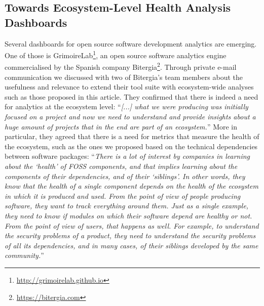\documentclass[smallextended]{svjour3}       %
\begin{document}
\subsection{Towards Ecosystem-Level Health Analysis Dashboards}
\label{sec:applications}

Several dashboards for open source software development analytics are emerging. One of those is GrimoireLab\footnote{\url{http://grimoirelab.github.io}}, an open source software analytics engine commercialised by the Spanish  company Bitergia\footnote{\url{https://bitergia.com}}. Through private e-mail communication we discussed with two of Bitergia's team members about the usefulness and relevance to extend their tool suite with ecosystem-wide analyses such as those proposed in this article. They confirmed that there is indeed a need for analytics at the ecosystem level: ``\textit{[...] what we were producing was initially focused on a project and now we need to understand and provide insights about a huge amount of projects that in the end are part of an ecosystem.}'' More in particular, they agreed that there is a need for metrics that measure the health of the ecosystem, such as the ones we proposed based on the technical dependencies between software packages: ``\textit{There is a lot of interest by companies in learning about the `health' of FOSS components, and that implies learning about the components of their dependencies, and of their `siblings'. In other words, they know that the health of a single component depends on the health of the ecosystem in which it is produced and used. From the point of view of people producing software, they want to track everything around them. Just as a single example, they need to know if modules on which their software depend are healthy or not. From the point of view of users, that happens as well. For example, to understand the security problems of a product, they need to understand the security problems of all its dependencies, and in many cases, of their siblings developed by the same community.}'' 
\end{document}
